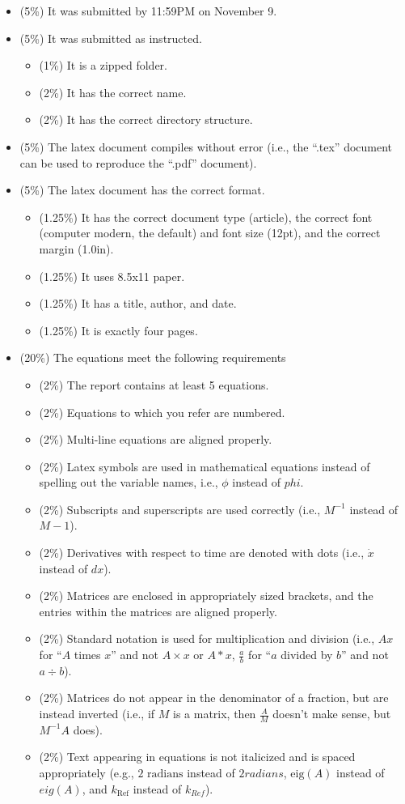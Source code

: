\documentclass[12pt]{article}
\begin{document}
\begin{itemize}

\item (5\%) It was submitted by 11:59PM on November 9.
\item (5\%) It was submitted as instructed.
\begin{itemize}
	\item (1\%) It is a zipped folder.
	\item (2\%) It has the correct name.
	\item (2\%) It has the correct directory structure.
\end{itemize}
\item (5\%) The latex document compiles without error (i.e., the ``.tex'' document can be used to reproduce the ``.pdf'' document).
\item (5\%) The latex document has the correct format.
\begin{itemize}
\item (1.25\%) It has the correct document type (article), the correct font (computer modern, the default) and font size (12pt), and the correct margin (1.0in).
\item (1.25\%) It uses 8.5x11 paper.
\item (1.25\%) It has a title, author, and date.
\item (1.25\%) It is exactly four pages.
\end{itemize}

\item (20\%) The equations meet the following requirements
\begin{itemize}
\item (2\%) The report contains at least 5 equations.
\item (2\%) Equations to which you refer are numbered.
\item (2\%) Multi-line equations are aligned properly.
\item (2\%) Latex symbols are used in mathematical equations instead of spelling out the variable names, i.e., $\phi$ instead of $phi$.
\item (2\%) Subscripts and superscripts are used correctly (i.e., $M^{-1}$ instead of $M-1$).
\item (2\%) Derivatives with respect to time are denoted with dots (i.e., $\dot{x}$ instead of $dx$).
\item (2\%) Matrices are enclosed in appropriately sized brackets, and the entries within the matrices are aligned properly.
\item (2\%) Standard notation is used for multiplication and division (i.e., $Ax$ for ``$A$ times $x$'' and not $A \times x$ or $A*x$, $\frac{a}{b}$ for ``$a$ divided by $b$'' and not $a \div b$).
\item (2\%) Matrices do not appear in the denominator of a fraction, but are instead inverted (i.e., if $M$ is a matrix, then $\frac{A}{M}$ doesn't make sense, but $M^{-1}A$ does).
\item (2\%) Text appearing in equations is not italicized and is spaced appropriately (e.g., $2 \text{ radians}$ instead of $2 radians$, $\text{eig}(A)$ instead of $eig(A)$, and $k_{\text{Ref}}$ instead of $k_{Ref}$).
\end{itemize}


\end{itemize}
\end{document}
